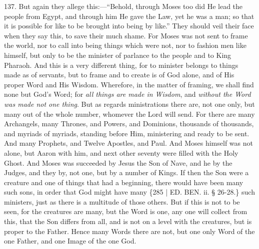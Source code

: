 137. But again they allege
this:—``Behold, through Moses too did He lead the people from Egypt,
and through him He gave the Law, yet he was a man; so that it is
possible for like to be brought into being by like.'' They should veil
their face when they say this, to save their much shame. For Moses was
not sent to frame the world, nor to call into being things which were
not, nor to fashion men like himself, but only to be the minister of
parlance to the people and to King Pharaoh. And this is a very
different thing, for to minister belongs to things made as of
servants, but to frame and to create is of God alone, and of His
proper Word and His Wisdom. Wherefore, in the matter of framing, we
shall find none but God's Word; for \emph{all things are made in Wisdom},
and \emph{without the Word was made not one thing}. But as regards
ministrations there are, not one only, but many out of the whole
number, whomever the Lord will send. For there are many Archangels,
many Thrones, and Powers, and Dominions, thousands of thousands, and
myriads of myriads, standing before Him, ministering and ready to be
sent. And many Prophets, and Twelve Apostles, and Paul. And Moses
himself was not alone, but Aaron with him, and next other seventy were
filled with the Holy Ghost. And Moses was succeeded by Jesus the Son
of Nave, and he by the Judges, and they by, not one, but by a number
of Kings. If then the Son were a creature and one of things that had a
beginning, there would have been many such sons, in order that God
might have many \{285 | ED. BEN.
ii. § 26-28.\} such ministers, just as there is a multitude of those
others. But if this is not to be seen, for the creatures are many, but
the Word is one, any one will collect from this, that the Son differs
from all, and is not on a level with the creatures, but is proper to
the Father. Hence many Words there are not, but one only Word of the
one Father, and one Image of the one God.

